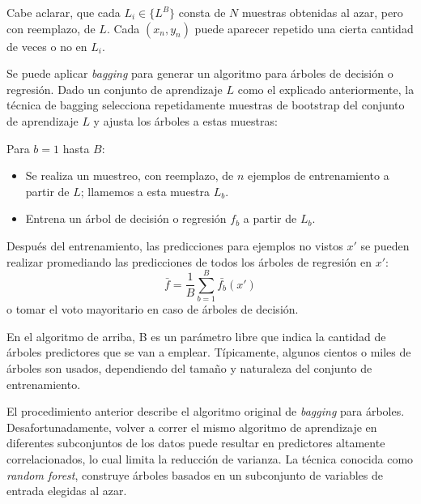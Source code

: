 	Cabe aclarar, que cada $L_i \in \{ L^{B} \}$ consta de $N$ muestras obtenidas al azar, pero con reemplazo, de $L$. Cada $(x_n, y_n)$ puede aparecer repetido una cierta cantidad de veces o no en $L_i$.
	
	Se puede aplicar \textit{bagging} para generar un algoritmo para árboles de decisión o regresión. Dado un conjunto de aprendizaje $L$ como el explicado anteriormente, la técnica de bagging selecciona repetidamente muestras de bootstrap del conjunto de aprendizaje $L$ y ajusta los árboles a estas muestras:

	Para $b=1$ hasta $B$:
	\begin{itemize}
		\item Se realiza un muestreo, con reemplazo, de $n$ ejemplos de entrenamiento a partir de $L$; llamemos a esta muestra $L_b$.
		\item Entrena un árbol de decisión o regresión $f_b$ a partir de $L_b$.
	\end{itemize}
	
	Después del entrenamiento, las predicciones para ejemplos no vistos $x'$ se pueden realizar promediando las predicciones de todos los árboles de regresión en $x'$:
	$$\bar{f} = \frac{1}{B}\sum_{b=1}^B\bar{f_b}(x')$$
	o tomar el voto mayoritario en caso de árboles de decisión.
	
	En el algoritmo de arriba, B es un parámetro libre que indica la cantidad de árboles predictores que se van a emplear. Típicamente, algunos cientos o miles de árboles son usados, dependiendo del tamaño y naturaleza del conjunto de entrenamiento.
			
	El procedimiento anterior describe el algoritmo original de \textit{bagging} para árboles. Desafortunadamente, volver a correr el mismo algoritmo de aprendizaje en diferentes subconjuntos de los datos puede resultar en predictores altamente correlacionados, lo cual limita la reducción de varianza. La técnica conocida como \textit{random forest}, construye árboles basados en un subconjunto de variables de entrada elegidas al azar. 
		
